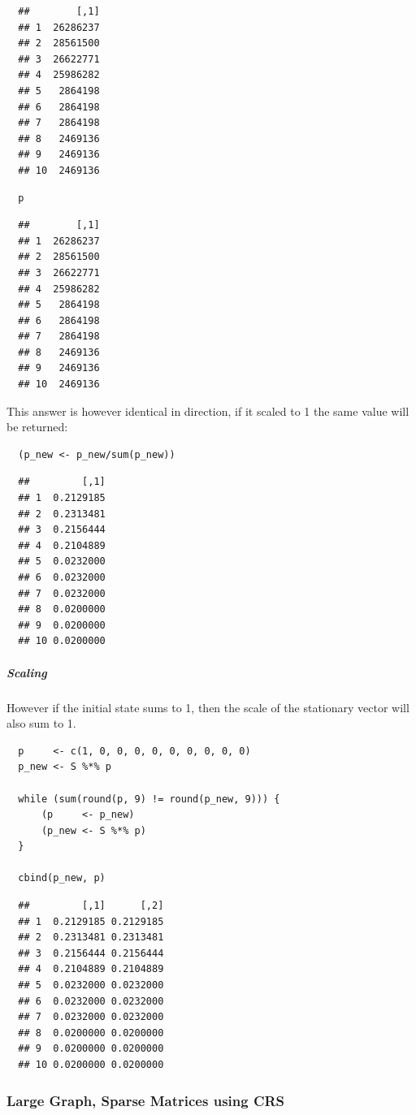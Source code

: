 \documentclass[11pt]{article}
\begin{document}
\begin{verbatim}
  ##        [,1]
  ## 1  26286237
  ## 2  28561500
  ## 3  26622771
  ## 4  25986282
  ## 5   2864198
  ## 6   2864198
  ## 7   2864198
  ## 8   2469136
  ## 9   2469136
  ## 10  2469136
\end{verbatim}

\begin{verbatim}
  p
\end{verbatim}

\begin{verbatim}
  ##        [,1]
  ## 1  26286237
  ## 2  28561500
  ## 3  26622771
  ## 4  25986282
  ## 5   2864198
  ## 6   2864198
  ## 7   2864198
  ## 8   2469136
  ## 9   2469136
  ## 10  2469136
\end{verbatim}

This answer is however identical in direction, if it scaled to 1 the
same value will be returned:

\begin{verbatim}
  (p_new <- p_new/sum(p_new))
\end{verbatim}

\begin{verbatim}
  ##         [,1]
  ## 1  0.2129185
  ## 2  0.2313481
  ## 3  0.2156444
  ## 4  0.2104889
  ## 5  0.0232000
  ## 6  0.0232000
  ## 7  0.0232000
  ## 8  0.0200000
  ## 9  0.0200000
  ## 10 0.0200000
\end{verbatim}

\subparagraph{Scaling}
\label{scaling}
However if the initial state sums to 1, then the scale of the stationary
vector will also sum to 1.

\begin{verbatim}
  p     <- c(1, 0, 0, 0, 0, 0, 0, 0, 0, 0)
  p_new <- S %*% p

  while (sum(round(p, 9) != round(p_new, 9))) {
      (p     <- p_new)
      (p_new <- S %*% p)
  }

  cbind(p_new, p)
\end{verbatim}

\begin{verbatim}
  ##         [,1]      [,2]
  ## 1  0.2129185 0.2129185
  ## 2  0.2313481 0.2313481
  ## 3  0.2156444 0.2156444
  ## 4  0.2104889 0.2104889
  ## 5  0.0232000 0.0232000
  ## 6  0.0232000 0.0232000
  ## 7  0.0232000 0.0232000
  ## 8  0.0200000 0.0200000
  ## 9  0.0200000 0.0200000
  ## 10 0.0200000 0.0200000
\end{verbatim}
\subsubsection{Large Graph, Sparse Matrices using CRS}
\label{sec:orgdf15edd}
\end{document}
